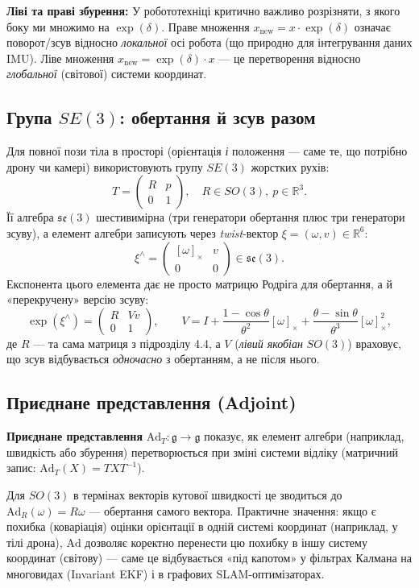 \documentclass[12pt, a4paper]{article}
\begin{document}
	\textbf{Ліві та праві збурення:} У робототехніці критично важливо розрізняти, з якого боку ми множимо на $\exp(\delta)$. Праве множення $x_{\text{new}} = x \cdot \exp(\delta)$ означає поворот/зсув відносно \textit{локальної} осі робота (що природно для інтегрування даних IMU). Ліве множення $x_{\text{new}} = \exp(\delta) \cdot x$ — це перетворення відносно \textit{глобальної} (світової) системи координат.
	
	\subsection{Група $SE(3)$: обертання й зсув разом}
	Для повної пози тіла в просторі (орієнтація \emph{і} положення — саме те, що потрібно дрону чи камері) використовують групу $SE(3)$ жорстких рухів:
	\[
	T = \begin{pmatrix} R & p \\ 0 & 1 \end{pmatrix}, \quad R \in SO(3),\ p \in \mathbb{R}^3.
	\]
	Її алгебра $\mathfrak{se}(3)$ шестивимірна (три генератори обертання плюс три генератори зсуву), а елемент алгебри записують через \textit{twist}-вектор $\xi = (\omega, v) \in \mathbb{R}^6$:
	\[
	\xi^\wedge = \begin{pmatrix} [\omega]_\times & v \\ 0 & 0 \end{pmatrix} \in \mathfrak{se}(3).
	\]
	Експонента цього елемента дає не просто матрицю Родріга для обертання, а й «перекручену» версію зсуву:
	\[
	\exp(\xi^\wedge) = \begin{pmatrix} R & Vv \\ 0 & 1 \end{pmatrix}, \qquad V = I + \frac{1-\cos\theta}{\theta^2}[\omega]_\times + \frac{\theta-\sin\theta}{\theta^3}[\omega]_\times^2,
	\]
	де $R$ — та сама матриця з підрозділу 4.4, а $V$ (\textit{лівий якобіан} $SO(3)$) враховує, що зсув відбувається \emph{одночасно} з обертанням, а не після нього.
	
	\subsection{Приєднане представлення (Adjoint)}
	\textbf{Приєднане представлення} $\mathrm{Ad}_T : \mathfrak{g} \to \mathfrak{g}$ показує, як елемент алгебри (наприклад, швидкість або збурення) перетворюється при зміні системи відліку (матричний запис: $\mathrm{Ad}_T(X) = T X T^{-1}$). 
	
	Для $SO(3)$ в термінах векторів кутової швидкості це зводиться до $\mathrm{Ad}_R(\omega) = R\omega$ — обертання самого вектора. Практичне значення: якщо є похибка (коваріація) оцінки орієнтації в одній системі координат (наприклад, у тілі дрона), $\mathrm{Ad}$ дозволяє коректно перенести цю похибку в іншу систему координат (світову) — саме це відбувається «під капотом» у фільтрах Калмана на многовидах (Invariant EKF) і в графових SLAM-оптимізаторах.
	
\end{document}
